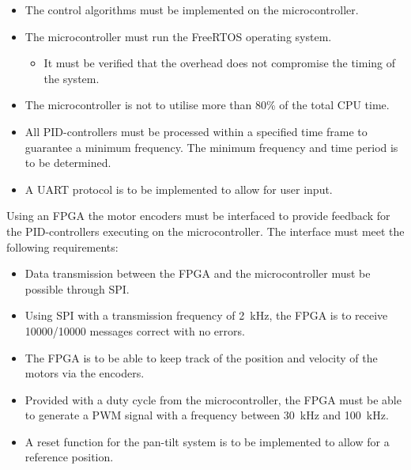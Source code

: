 \documentclass[../../main.tex]{subfiles}
\begin{document}
\begin{itemize}
    \item The control algorithms must be implemented on the microcontroller.
    \item The microcontroller must run the FreeRTOS operating system.
    \begin{itemize}
        \item It must be verified that the overhead does not compromise the timing of the system.
    \end{itemize}
    \item The microcontroller is not to utilise more than 80\% of the total CPU time.
    \item All PID-controllers must be processed within a specified time frame to guarantee a minimum frequency. The minimum frequency and time period is to be determined.
    
    \item A UART protocol is to be implemented to allow for user input.
\end{itemize}
Using an FPGA the motor encoders must be interfaced to provide feedback for the PID-controllers executing on the microcontroller. The interface must meet the following requirements:
\begin{itemize}
    \item Data transmission between the FPGA and the microcontroller must be possible through SPI.
    \item Using SPI with a transmission frequency of \SI{2}{\kilo\hertz}, the FPGA is to receive 10000/10000 messages correct with no errors.
    \item The FPGA is to be able to keep track of the position and velocity of the motors via the encoders.
    \item Provided with a duty cycle from the microcontroller, the FPGA must be able to generate a PWM signal with a frequency between \SI{30}{\kilo\hertz} and \SI{100}{\kilo\hertz}.
    \item A reset function for the pan-tilt system is to be implemented to allow for a reference position.
\end{itemize}
\end{document}
